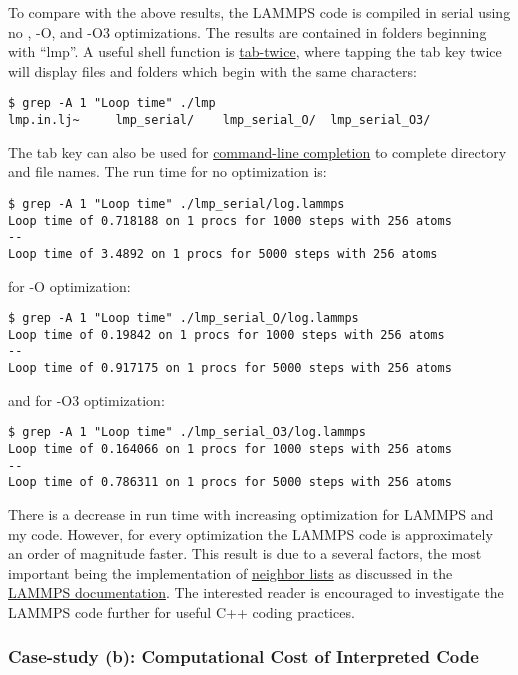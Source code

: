 To compare with the above results, the LAMMPS code is compiled in serial 
using no , -O, and -O3 optimizations.  
The results are contained in folders beginning with ``lmp''.  A useful 
shell function is 
\href{http://www.tuxfiles.org/linuxhelp/tabtrick.html}{tab-twice}, 
where tapping the tab key twice 
will display files and folders which begin with the same 
characters:
\begin{lstlisting}
$ grep -A 1 "Loop time" ./lmp
lmp.in.lj~     lmp_serial/    lmp_serial_O/  lmp_serial_O3/
\end{lstlisting}
The tab key can also be used for  
\href{http://en.wikipedia.org/wiki/Command-line_completion}
{command-line completion} to complete directory and file names. The run 
time for no optimization is:
\begin{lstlisting}
$ grep -A 1 "Loop time" ./lmp_serial/log.lammps
Loop time of 0.718188 on 1 procs for 1000 steps with 256 atoms
--
Loop time of 3.4892 on 1 procs for 5000 steps with 256 atoms
\end{lstlisting}
for -O optimization:
\begin{lstlisting}
$ grep -A 1 "Loop time" ./lmp_serial_O/log.lammps
Loop time of 0.19842 on 1 procs for 1000 steps with 256 atoms
--
Loop time of 0.917175 on 1 procs for 5000 steps with 256 atoms
\end{lstlisting}
and for -O3 optimization:
\begin{lstlisting}
$ grep -A 1 "Loop time" ./lmp_serial_O3/log.lammps
Loop time of 0.164066 on 1 procs for 1000 steps with 256 atoms
--
Loop time of 0.786311 on 1 procs for 5000 steps with 256 atoms
\end{lstlisting}

There is a decrease in run time with increasing optimization 
for LAMMPS and my code. However, for every 
optimization the LAMMPS code is approximately an order of 
magnitude faster.  This result is 
due to a several factors, the most important being 
the implementation of 
\href{http://en.wikipedia.org/wiki/Neighbor_list}{neighbor lists} 
as discussed in the 
\href{http://lammps.sandia.gov/doc/neighbor.html}
{LAMMPS documentation}. The interested reader is encouraged to 
investigate the LAMMPS code further for useful C++ coding 
practices. 

\subsubsection{\label{A:coding_lang:case2}
Case-study (b): Computational Cost of Interpreted Code}

